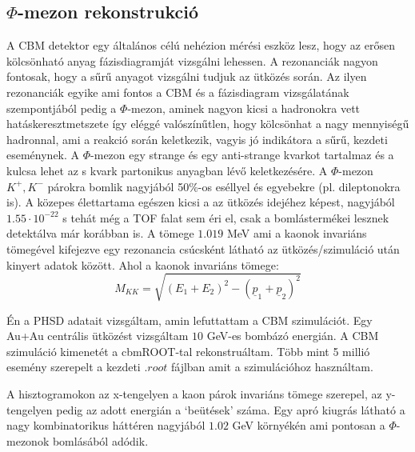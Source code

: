 \documentclass[a4paper,12pt]{article}
\begin{document}
\subsection{ $\Phi$-mezon rekonstrukció}
\vspace{5mm}
\par A CBM detektor egy általános célú nehézion mérési eszköz lesz, hogy az erősen kölcsönható anyag fázisdiagramját vizsgálni lehessen. A
rezonanciák nagyon fontosak, hogy a sűrű anyagot vizsgálni tudjuk az ütközés során. Az ilyen rezonanciák egyike ami fontos a CBM és a 
fázisdiagram vizsgálatának szempontjából pedig a $\Phi$-mezon, aminek nagyon kicsi a hadronokra vett hatáskeresztmetszete így eléggé 
valószínűtlen, hogy kölcsönhat a nagy mennyiségű hadronnal, ami a reakció során keletkezik, vagyis jó indikátora a sűrű, kezdeti eseménynek.
A $\Phi$-mezon egy strange és egy anti-strange kvarkot tartalmaz és a kulcsa lehet az s kvark partonikus anyagban lévő keletkezésére. A
$\Phi$-mezon $K^{+}, K^{-}$ párokra bomlik nagyjából 50$\%$-os eséllyel és egyebekre (pl. dileptonokra is). A közepes élettartama egészen
kicsi a az ütközés idejéhez képest, nagyjából $1.55\cdot10^{-22}$ s tehát még a TOF falat sem éri el, csak a bomlástermékei lesznek detektálva már korábban is. 
A tömege $1.019$ MeV ami a kaonok invariáns tömegével kifejezve egy rezonancia csúcsként látható az ütközés/szimuláció után kinyert 
adatok között. Ahol a kaonok invariáns tömege:
\begin{equation*}
M_{KK} = \sqrt{(E_{1}+E_{2})^{2} - (\underline{p}_{1} + \underline{p}_{2})^{2}}
\end{equation*}
\vspace{5mm}
\par Én a PHSD adatait vizsgáltam, amin lefuttattam a CBM szimulációt. Egy Au+Au centrális ütközést vizsgáltam $10$ GeV-es bombázó energián. 
A CBM szimuláció kimenetét a cbmROOT-tal rekonstruáltam. Több mint 5 millió esemény szerepelt a kezdeti $.root$ fájlban amit a szimulációhoz 
használtam.
\vspace{5mm}
\par A hisztogramokon az x-tengelyen a kaon párok invariáns tömege szerepel, az y-tengelyen pedig az adott energián a `beütések' száma. Egy 
apró kiugrás látható a nagy kombinatorikus háttéren nagyjából $1.02$ GeV környékén ami pontosan a $\Phi$-mezonok bomlásából adódik.
\end{document}
